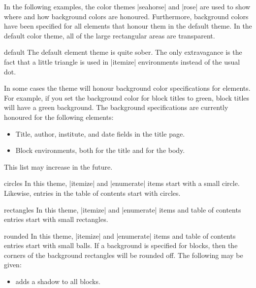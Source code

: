 In the following examples, the color themes |seahorse| and |rose| are
used to show where and how background colors are
honoured. Furthermore, background colors have been specified for all
elements that honour them in the default theme. In the default color
theme, all of the large rectangular areas are transparent.

\begin{innerthemeexample}{default}
  The default element theme is quite sober. The only extravagance is
  the fact that a little triangle is used in |itemize| environments
  instead of the usual dot.

  In some cases the theme will honour background color specifications
  for elements. For example, if you set the background color for block
  titles to green, block titles will have a green background. The
  background specifications are currently honoured for the following
  elements:
  \begin{itemize}
  \item Title, author, institute, and date fields in the title
    page.
  \item Block environments, both for the title and for the body.
  \end{itemize}
  This list may increase in the future.
\end{innerthemeexample}

\begin{innerthemeexample}{circles}
  In this theme, |itemize| and |enumerate| items start with a small
  circle. Likewise, entries in the table of contents start with
  circles.
\end{innerthemeexample}

\begin{innerthemeexample}{rectangles}
  In this theme, |itemize| and |enumerate| items and table of contents
  entries  start with small rectangles.
\end{innerthemeexample}

\begin{innerthemeexample}{rounded}
  In this theme, |itemize| and |enumerate| items and table of contents
  entries start with small balls. If a background is specified for
  blocks, then the corners of the background rectangles will be
  rounded off. The following  may be given:

  \begin{itemize}
  \item {} adds a shadow to all blocks.
  \end{itemize}
\end{innerthemeexample}

